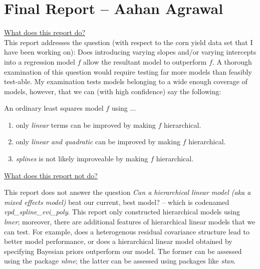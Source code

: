 \documentclass[a4paper]{article}
\begin{document}
\section{Final Report -- Aahan Agrawal}
\underline{What does this report do?} \\

This report addresses the question (with respect to the corn yield data set that I have been working on): Does introducing varying slopes and/or varying intercepts into a regression model $f$ allow the resultant model to outperform $f$. A thorough examination of this question would require testing far more models than feasibly test-able. My examination tests models belonging to a wide enough coverage of models, however, that we can (with high confidence) say the following:

An ordinary least squares model $f$ using $\dots$
\begin{enumerate}
    \item  only \textit{linear} terms can be improved by making $f$ hierarchical. \\
    \item only \textit{linear and quadratic} can be improved by making $f$ hierarchical. \\
    \item \textit{splines} is not likely improveable by making $f$ hierarchical.
\end{enumerate}

\underline{What does this report not do?}

This report does not answer the question \textit{Can a hierarchical linear model (aka a mixed effects model)} beat our current, best model? -- which is codenamed \textit{vpd\_spline\_evi\_poly}. This report only constructed hierarchical models using \textit{lmer}; moreover, there are additional features of hierarchical linear models that we can test. For example, does a heterogenous residual covariance structure lead to better model performance, or does a hierarchical linear model obtained by specifying Bayesian priors outperform our model. The former can be assessed using the package \textit{nlme}; the latter can be assessed using packages like \textit{stan}.
\end{document}
